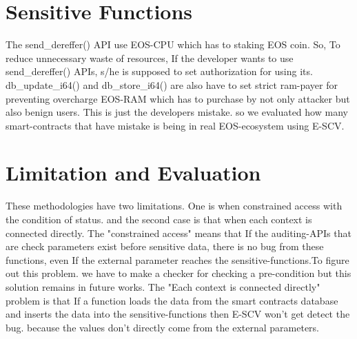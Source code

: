 \section{Sensitive Functions}
The send\_dereffer() API use EOS-CPU which has to staking EOS coin. So, To reduce unnecessary waste of resources, If the developer wants to use send\_dereffer() APIs, s/he is supposed to set authorization for using its. db\_update\_i64() and db\_store\_i64() are also have to set strict ram-payer for preventing overcharge EOS-RAM which has to purchase by not only attacker but also benign users. This is just the developers mistake. so we evaluated how many smart-contracts that have mistake is being in real EOS-ecosystem using E-SCV.

\section{Limitation and Evaluation}



These methodologies have two limitations. One is when constrained access with the condition of status. and the second case is that when each context is connected directly. 
The "constrained access" means that If the auditing-APIs that are check parameters exist before sensitive data, there is no bug from these functions, even If the external parameter reaches the sensitive-functions.To figure out this problem. we have to make a checker for checking a pre-condition but this solution remains in future works.
The "Each context is connected directly" problem is that If a function loads the data from the smart contracts database and inserts the data into the sensitive-functions then E-SCV won't get detect the bug. because the values don't directly come from the external parameters. 


